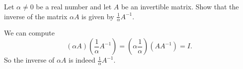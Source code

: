 \documentclass{ximera}
\begin{document}
\begin{exercise} \label{c4.8.2}
Let $\alpha \not=0$ be a real number and let $A$ be an invertible
matrix.  Show that the inverse of the matrix $\alpha A$ is given by
$\frac{1}{\alpha}A^{-1}$.

\begin{solution}

We can compute
\[ (\alpha A)\left(\frac{1}{\alpha}A^{-1}\right) =
\left(\alpha\frac{1}{\alpha}\right)(AA^{-1}) = I. \]
So the inverse of $\alpha A$ is indeed $\frac{1}{\alpha}A^{-1}$.

\end{solution}
\end{exercise}
\end{document}

